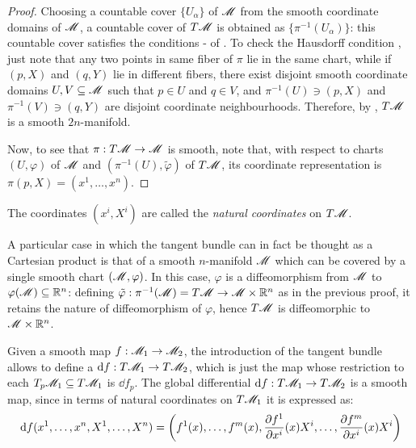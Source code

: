 \begin{proofbox}
\begin{proof}
    Choosing a countable cover $ \{U_\alpha\} $ of $ \mathscr{M} $ from the smooth coordinate domains of $ \mathscr{M} $, a countable cover of $ T\mathscr{M} $ is obtained as $ \{\pi^{-1}(U_\alpha)\} $: this countable cover satisfies the conditions - of . To check the Hausdorff condition , just note that any two points in same fiber of $ \pi $ lie in the same chart, while if $ (p,X) $ and $ (q,Y) $ lie in different fibers, there exist disjoint smooth coordinate domains $ U , V \subseteq \mathscr{M} $ such that $ p \in U $ and $ q \in V $, and $ \pi^{-1}(U) \ni (p,X) $ and $ \pi^{-1}(V) \ni (q,Y) $ are disjoint coordinate neighbourhoods. Therefore, by , $ T\mathscr{M} $ is a smooth $ 2n $-manifold.

    Now, to see that $ \pi : T\mathscr{M} \rightarrow \mathscr{M} $ is smooth, note that, with respect to charts $ (U,\varphi) $ of $ \mathscr{M} $ and $ (\pi^{-1}(U) , \tilde{\varphi}) $ of $ T\mathscr{M} $, its coordinate representation is $ \pi(p , X) = (x^1 , \dots , x^n) $.
  \end{proof}
\end{proofbox}

The coordinates $ (x^i , X^i) $ are called the \emph{natural coordinates} on $ T\mathscr{M} $.

A particular case in which the tangent bundle can in fact be thought as a Cartesian product is that of a smooth $ n $-manifold $ \mathscr{M} $ which can be covered by a single smooth chart $ (\mathscr{M},\varphi) $. In this case, $ \varphi $ is a diffeomorphism from $ \mathscr{M} $ to $ \varphi(\mathscr{M}) \subseteq \mathbb{R}^n $: defining $ \tilde{\varphi} : \pi^{-1}(\mathscr{M}) = T\mathscr{M} \rightarrow \mathscr{M} \times \mathbb{R}^n $ as in the previous proof, it retains the nature of diffeomorphism of $ \varphi $, hence $ T\mathscr{M} $ is diffeomorphic to $ \mathscr{M} \times \mathbb{R}^n $.

Given a smooth map $ f : \mathscr{M}_1 \rightarrow \mathscr{M}_2 $, the introduction of the tangent bundle allows to define a  $ \mathrm{d} f : T\mathscr{M}_1 \rightarrow T\mathscr{M}_2 $, which is just the map whose restriction to each $ T_p\mathscr{M}_1 \subseteq T\mathscr{M}_1 $ is $ \dd f_p $. The global differential $ \mathrm{d} f : T\mathscr{M}_1 \rightarrow T\mathscr{M}_2 $ is a smooth map, since in terms of natural coordinates on $ T\mathscr{M}_1 $ it is expressed as:
\begin{equation*}
  \mathrm{d} f(x^1 , \dots , x^n , X^1 , \dots , X^n) = \left( f^1(x) , \dots , f^m(x) , \frac{\partial f^1}{\partial x^i}(x) X^i , \dots , \frac{\partial f^m}{\partial x^i}(x) X^i \right)
\end{equation*}

